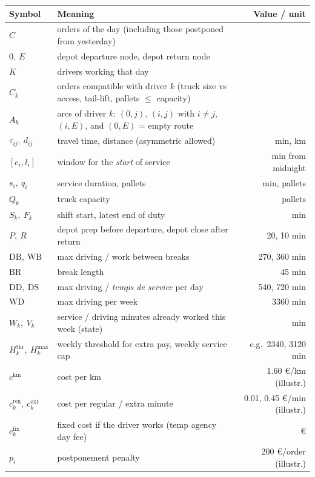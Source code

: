 \documentclass[11pt,a4paper]{article}
\newcommand{\DB}{\mathrm{DB}}\newcommand{\WB}{\mathrm{WB}}\newcommand{\BR}{\mathrm{BR}}
\newcommand{\DD}{\mathrm{DD}}\newcommand{\DS}{\mathrm{DS}}\newcommand{\WD}{\mathrm{WD}}
\begin{document}
\begin{center}\small
\begin{tabularx}{\textwidth}{@{}l X r@{}}
\toprule
\textbf{Symbol} & \textbf{Meaning} & \textbf{Value / unit} \\
\midrule
$C$ & orders of the day (including those postponed from yesterday) & \\
$0,\ E$ & depot departure node, depot return node & \\
$K$ & drivers working that day & \\
$C_k$ & orders compatible with driver $k$ (truck size vs access, tail-lift, pallets $\le$ capacity) & \\
$A_k$ & arcs of driver $k$: $(0,j)$, $(i,j)$ with $i\ne j$, $(i,E)$, and $(0,E)$ = empty route & \\
$\tau_{ij},\ d_{ij}$ & travel time, distance (asymmetric allowed) & min, km \\
$[e_i, l_i]$ & window for the \emph{start} of service & min from midnight \\
$s_i,\ q_i$ & service duration, pallets & min, pallets \\
$Q_k$ & truck capacity & pallets \\
$S_k,\ F_k$ & shift start, latest end of duty & min \\
$P,\ R$ & depot prep before departure, depot close after return & 20, 10 min \\
$\DB,\ \WB$ & max driving / work between breaks & 270, 360 min \\
$\BR$ & break length & 45 min \\
$\DD,\ \DS$ & max driving / \emph{temps de service} per day & 540, 720 min \\
$\WD$ & max driving per week & 3360 min \\
$W_k,\ V_k$ & service / driving minutes already worked this week (state) & min \\
$H^{\mathrm{thr}}_k,\ H^{\max}_k$ & weekly threshold for extra pay, weekly service cap & e.g.\ 2340, 3120 min \\
$c^{\mathrm{km}}$ & cost per km & 1.60 €/km (illustr.) \\
$c^{\mathrm{reg}}_k,\ c^{\mathrm{ext}}_k$ & cost per regular / extra minute & 0.01, 0.45 €/min (illustr.) \\
$c^{\mathrm{fix}}_k$ & fixed cost if the driver works (temp agency day fee) & € \\
$p_i$ & postponement penalty & 200 €/order (illustr.) \\
\bottomrule
\end{tabularx}
\end{center}
\end{document}

